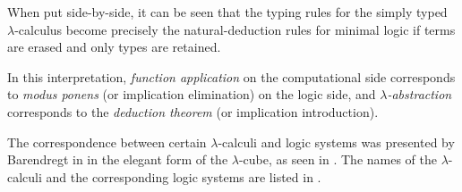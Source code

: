 When put side-by-side, it can be seen that the typing rules for the simply typed
$\lambda$-calculus become precisely the natural-deduction rules for minimal logic
if terms are erased and only types are retained.

In this interpretation, \emph{function application} on the computational side corresponds
to \emph{modus ponens} (or implication elimination) on the logic side, and
\emph{$\lambda$-abstraction} corresponds to the \emph{deduction theorem} (or implication
introduction).

The correspondence between certain $\lambda$-calculi and logic systems was presented
by Barendregt in \cite{barendregt91} in the elegant form of the $\lambda$-cube, as seen in
. The names of the $\lambda$-calculi and the corresponding
logic systems are listed in .

